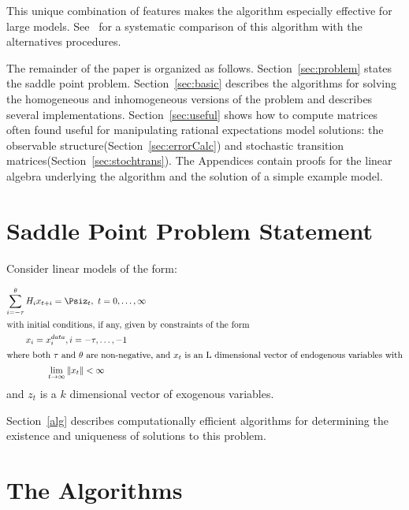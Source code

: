 \documentclass{elsart}
\begin{document}
This unique combination of features 
makes the algorithm especially effective 
for large models.
See~\cite{anderson06} for a systematic comparison of this algorithm with
the alternatives procedures.

The remainder of the paper is organized as follows.
Section~\ref{sec:problem} states the saddle point problem.
Section~\ref{sec:basic} describes the algorithms for solving
the homogeneous and inhomogeneous 
 versions of the problem and describes several implementations.
Section~\ref{sec:useful} shows how to compute matrices often found useful
for manipulating rational expectations model solutions:
the observable structure(Section~\ref{sec:errorCalc}) and
stochastic transition matrices(Section~\ref{sec:stochtrans}).
 The Appendices contain  proofs for the
linear algebra underlying the 
algorithm and the solution of a simple example model.





\section{Saddle Point Problem Statement}




Consider linear models of the form:


\begin{gather}
\sum_{i=-\tau}^\theta{H_i x_{t+i}}= \Psi%
z_{t}, \,\, t = 0,\ldots,\infty\label{eq:canonical}\\ \intertext{with initial conditions, if any, given by constraints of the form}%
x_i  =  x^{data}_i,  i =  - \tau, \ldots, -1\label{eq:init}\\ \intertext{where both $\tau$ and $\theta$ are non-negative, and $x_t$ is an L dimensional vector 
of endogenous variables with}%
\lim_{ t \rightarrow\infty} \|x_t\|   < \infty\label{eq:limit} %
\end{gather}
{ and $z_t$ is a $k$ dimensional vector of exogenous variables.}

    

Section~\ref{alg} describes computationally efficient algorithms for
determining the existence and uniqueness of solutions to this problem.


\label{sec:problem}  

\section{The Algorithms}
\end{document}
